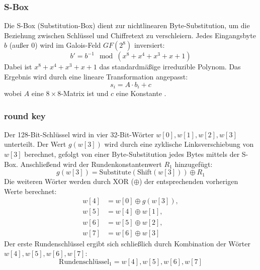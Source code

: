 \subsubsection{S-Box}
Die S-Box (Substitution-Box) dient zur nichtlinearen Byte-Substitution, um die Beziehung zwischen Schlüssel und Chiffretext zu verschleiern. Jedes Eingangsbyte \(b\) (außer 0) wird im Galois-Feld \(GF(2^8)\) inversiert:
\[
b' = b^{-1} \mod (x^8 + x^4 + x^3 + x + 1)
\]
Dabei ist \(x^8 + x^4 + x^3 + x + 1\) das standardmäßige irreduzible Polynom. Das Ergebnis wird durch eine lineare Transformation angepasst:
\[
s_i = A \cdot b_i + c
\]
wobei \(A\) eine $8 \times 8$-Matrix ist und \(c\) eine Konstante \cite{Endliche_körper} \cite{S_Box}.

\subsubsection{round key}

Der 128-Bit-Schlüssel wird in vier 32-Bit-Wörter $w[0], w[1], w[2], w[3]$ unterteilt. 
Der Wert $g(w[3])$ wird durch eine zyklische Linksverschiebung von $w[3]$ berechnet, 
gefolgt von einer Byte-Substitution jedes Bytes mittels der S-Box. Anschließend wird 
der Rundenkonstantenwert $R_1$ hinzugefügt:
\[
g(w[3]) = \text{Substitute}(\text{Shift}(w[3])) \oplus R_1
\]
Die weiteren Wörter werden durch XOR ($\oplus$) der entsprechenden vorherigen Werte berechnet:
\begin{align*}
w[4] &= w[0] \oplus g(w[3]), \\
w[5] &= w[4] \oplus w[1], \\
w[6] &= w[5] \oplus w[2], \\
w[7] &= w[6] \oplus w[3]
\end{align*}
Der erste Rundenschlüssel ergibt sich schließlich durch Kombination der Wörter $w[4], w[5], w[6], w[7]$:
\[
\text{Rundenschlüssel}_1 = w[4], w[5], w[6], w[7]
\]

